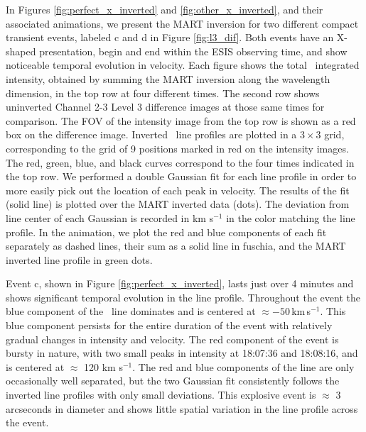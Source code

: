     	In Figures \ref{fig:perfect_x_inverted} and \ref{fig:other_x_inverted}, and their associated animations, we present the MART inversion for two different compact transient events, labeled c and d in Figure \ref{fig:l3_dif}.
    	Both events have an X-shaped presentation, begin and end within the ESIS observing time, and show noticeable temporal evolution in velocity.
		Each figure shows the total \ov \ integrated intensity, obtained by summing the MART inversion along the wavelength dimension, in the top row  at four different times. 
		The second row shows uninverted Channel 2-3 Level 3 difference images at those same times for comparison.
		The FOV of the intensity image from the top row is shown as a red box on the difference image.
		Inverted \ov\ line profiles are plotted in a $3\times 3$ grid, corresponding to the grid of 9 positions marked in red on the intensity images. The red, green, blue, and black curves correspond to the four times indicated in the top row.
		We performed a double Gaussian fit for each line profile in order to more easily pick out the location of each peak in velocity.
		The results of the fit (solid line) is plotted over the MART inverted data (dots).
		The deviation from line center of each Gaussian is recorded in km s$^{-1}$ in the color matching the line profile.
		In the animation, we plot the red and blue components of each fit separately as dashed lines, their sum as a solid line in fuschia, and the MART inverted line profile in  green dots.
		

		
		Event c, shown in Figure \ref{fig:perfect_x_inverted}, lasts just over 4 minutes and shows significant temporal evolution in the line profile.
		Throughout the event the blue component of the \ov \ line dominates and is centered at $\approx -50$\,km\,s$^{-1}$.
		This blue component persists for the entire duration of the event with %
		relatively gradual changes in intensity and velocity.
		The red component of the event is bursty in nature, with two small peaks in intensity at 18:07:36 and 18:08:16, and is centered at $\approx$ 120 km s$^{-1}$. 
	    The red and blue components of the line are only occasionally well separated, but the two Gaussian fit consistently follows the inverted line profiles with only small deviations.
		This explosive event is $\approx$ 3 arcseconds in diameter and shows little spatial variation in the line profile across the event.
		
